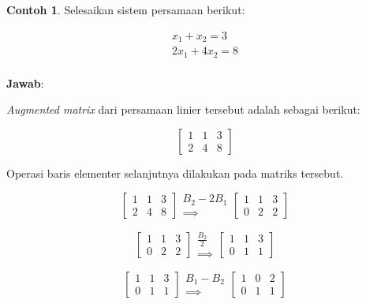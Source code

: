 \documentclass[
]{book}
\theoremstyle{definition}
\theoremstyle{definition}
\newtheorem{example}{Contoh}[chapter]
\theoremstyle{definition}
\theoremstyle{definition}
\theoremstyle{remark}
\begin{document}
\begin{example}
\protect\hypertarget{exm:gaussjordanexm}{}\label{exm:gaussjordanexm}Selesaikan sistem persamaan berikut:
\end{example}

\[
\begin{matrix}
  x_1+x_2=3 \\
  2x_1+4x_2=8 \\
\end{matrix}
\]

\textbf{Jawab}:

\emph{Augmented matrix} dari persamaan linier tersebut adalah sebagai berikut:

\[
\begin{bmatrix}
     1 & 1 & 3     \\[0.3em]
     2 & 4 & 8
\end{bmatrix}
\]

Operasi baris elementer selanjutnya dilakukan pada matriks tersebut.

\begin{equation*}
\begin{bmatrix}
     1 & 1 & 3     \\[0.3em]
     2 & 4 & 8
\end{bmatrix}
\begin{matrix}
  B_2-2B_1 \\
  \implies 
\end{matrix}
\begin{bmatrix}
     1 & 1 & 3     \\[0.3em]
     0 & 2 & 2
\end{bmatrix}
\end{equation*}

\begin{equation*}
\begin{bmatrix}
     1 & 1 & 3     \\[0.3em]
     0 & 2 & 2
\end{bmatrix}
\begin{matrix}
  \frac{B_2}{2} \\
  \implies
\end{matrix}
\begin{bmatrix}
     1 & 1 & 3     \\[0.3em]
     0 & 1 & 1
\end{bmatrix}
\end{equation*}

\begin{equation*}
\begin{bmatrix}
     1 & 1 & 3     \\[0.3em]
     0 & 1 & 1
\end{bmatrix}
\begin{matrix}
  B_1-B_2 \\
  \implies
\end{matrix}
\begin{bmatrix}
     1 & 0 & 2     \\[0.3em]
     0 & 1 & 1
\end{bmatrix}
\end{equation*}
\end{document}
